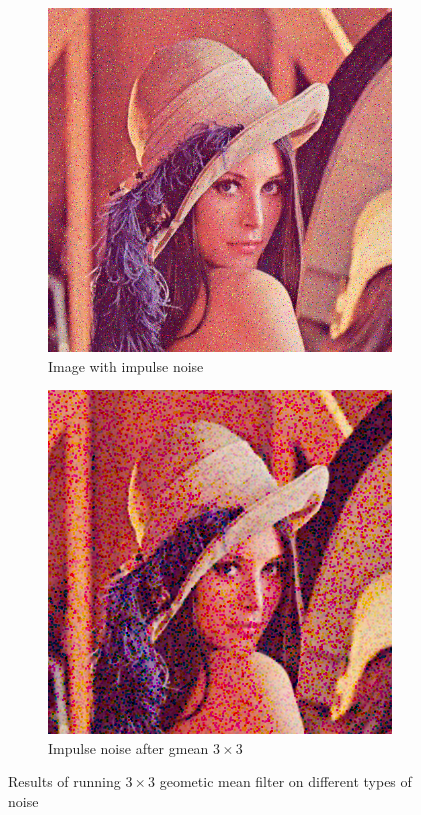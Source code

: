 \documentclass[12pt]{article}
\theoremstyle{definition}
\begin{document}
\begin{figure}[ht]
    \begin{subfigure}[t]{.4\textwidth}\centering
        \includegraphics[width=.8\textwidth]{lenac_impulse3}
        \caption{Image with impulse noise}
    \end{subfigure}
    \begin{subfigure}[t]{.4\textwidth}\centering
        \includegraphics[width=.8\textwidth]{lenac_impulse_gmean}
        \caption{Impulse noise after gmean $3\times3$}
    \end{subfigure}
    \caption{Results of running $3\times3$ geometic mean filter on different types of noise}
\end{figure}
\end{document}
